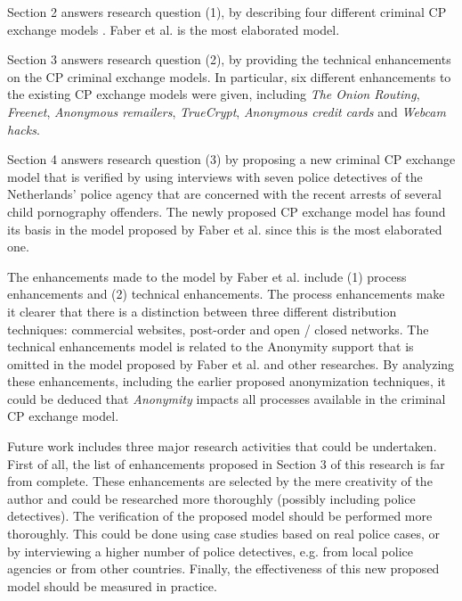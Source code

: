 \documentclass{sig-alternate-br}
\begin{document}
Section 2 answers research question (1), by describing four different criminal CP exchange models \cite{en2011phishing, wortley2006child, wijk2009achter, callanan2009internet}. Faber et al. \cite{en2011phishing} is the most elaborated model.

Section 3 answers research question (2), by providing the technical enhancements on the CP criminal exchange models. In particular, six different enhancements to the existing CP exchange models were given, including \textit{The Onion Routing}, \textit{Freenet}, \textit{Anonymous remailers}, \textit{TrueCrypt}, \textit{Anonymous credit cards} and \textit{Webcam hacks}.

Section 4 answers research question (3) by proposing a new criminal CP exchange model that is verified by using interviews with seven police detectives of the Netherlands' police agency that are concerned with the recent arrests of several child pornography offenders. The newly proposed CP exchange model has found its basis in the model proposed by Faber et al. \cite{en2011phishing} since this is the most elaborated one. 

The enhancements made to the model by Faber et al. include (1) process enhancements and (2) technical enhancements. The process enhancements make it clearer that there is a distinction between three different distribution techniques: commercial websites, post-order and open / closed networks. The technical enhancements model is related to the Anonymity support that is omitted in the model proposed by Faber et al. \cite{en2011phishing} and other researches. By analyzing these enhancements, including  the earlier proposed anonymization techniques, it could be deduced that \textit{Anonymity} impacts all processes available in the criminal CP exchange model.

Future work includes three major research activities that could be undertaken. First of all, the list of enhancements proposed in Section 3 of this research is far from complete. These enhancements are selected by the mere creativity of the author and could be researched more thoroughly (possibly including police detectives). The verification of the proposed model should be performed more thoroughly. This could be done using case studies based on real police cases, or by interviewing a higher number of police detectives, e.g. from local police agencies or from other countries.
Finally, the effectiveness of this new proposed model should be measured in practice.



\vspace{50 mm}


\balancecolumns
\end{document}
